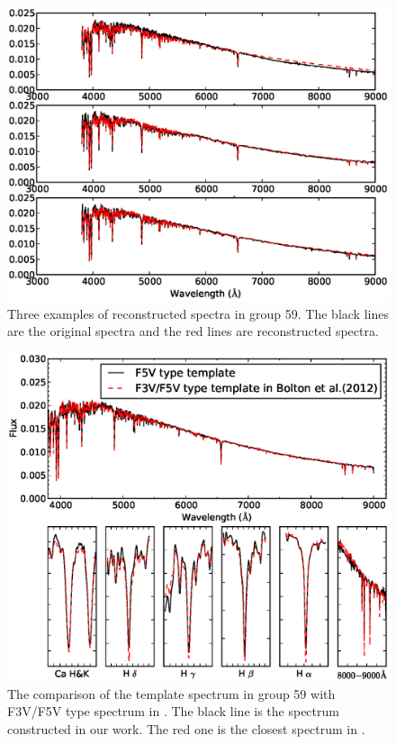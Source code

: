 \documentclass[manuscript]{aastex}
\begin{document}
 \begin{figure}
   \centering
   \includegraphics[width=14cm, angle=0,clip]{f81.eps}
   \caption{Three examples of reconstructed spectra in group 59.
The black lines are the original spectra and the red lines are reconstructed spectra.
   }
   \label{Fig81}
\end{figure}
\begin{figure}
   \centering
   \includegraphics[width=14cm, angle=0,clip]{f91.eps}
   \caption{The comparison of the template spectrum in group 59 with  F3V/F5V type spectrum  in  \citet{bolton2012spectral}.
The black line is the spectrum constructed in our work.
The red one is the closest spectrum in  \citet{bolton2012spectral}.
   }
   \label{Fig91}
\end{figure}
\end{document}
